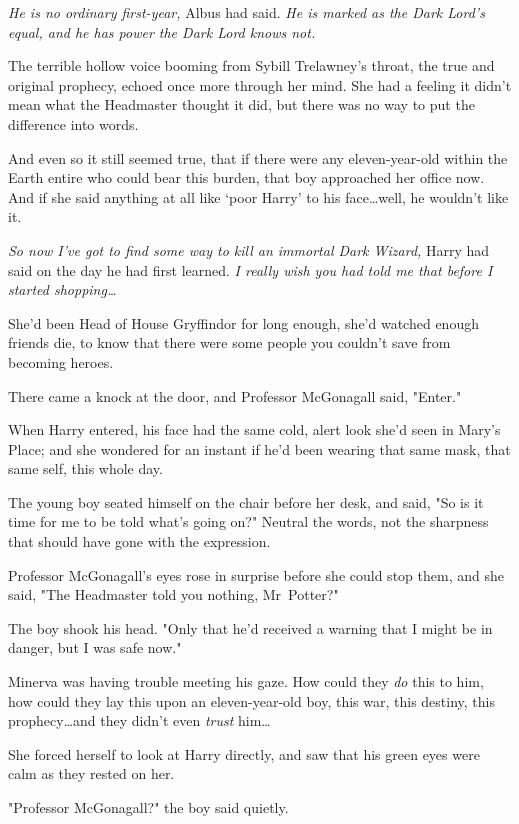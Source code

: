 \emph{He is no ordinary first-year,} Albus had said. \emph{He is marked as the
Dark Lord's equal, and he has power the Dark Lord knows not.}

The terrible hollow voice booming from Sybill Trelawney's throat, the true and
original prophecy, echoed once more through her mind. She had a feeling it
didn't mean what the Headmaster thought it did, but there was no way to put the
difference into words.

And even so it still seemed true, that if there were any eleven-year-old within
the Earth entire who could bear this burden, that boy approached her office
now. And if she said anything at all like `poor Harry' to his face…well,
he wouldn't like it.

\emph{So now I've got to find some way to kill an immortal Dark Wizard,} Harry
had said on the day he had first learned. \emph{I really wish you had told me
that before I started shopping…}

She'd been Head of House Gryffindor for long enough, she'd watched enough
friends die, to know that there were some people you couldn't save from
becoming heroes.

There came a knock at the door, and Professor McGonagall said, "Enter."

When Harry entered, his face had the same cold, alert look she'd seen in Mary's
Place; and she wondered for an instant if he'd been wearing that same mask,
that same self, this whole day.

The young boy seated himself on the chair before her desk, and said, "So is it
time for me to be told what's going on?" Neutral the words, not the sharpness
that should have gone with the expression.

Professor McGonagall's eyes rose in surprise before she could stop them, and
she said, "The Headmaster told you nothing, Mr~Potter?"

The boy shook his head. "Only that he'd received a warning that I might be in
danger, but I was safe now."

Minerva was having trouble meeting his gaze. How could they \emph{do} this to
him, how could they lay this upon an eleven-year-old boy, this war, this
destiny, this prophecy…and they didn't even \emph{trust} him…

She forced herself to look at Harry directly, and saw that his green eyes were
calm as they rested on her.

"Professor McGonagall?" the boy said quietly.

